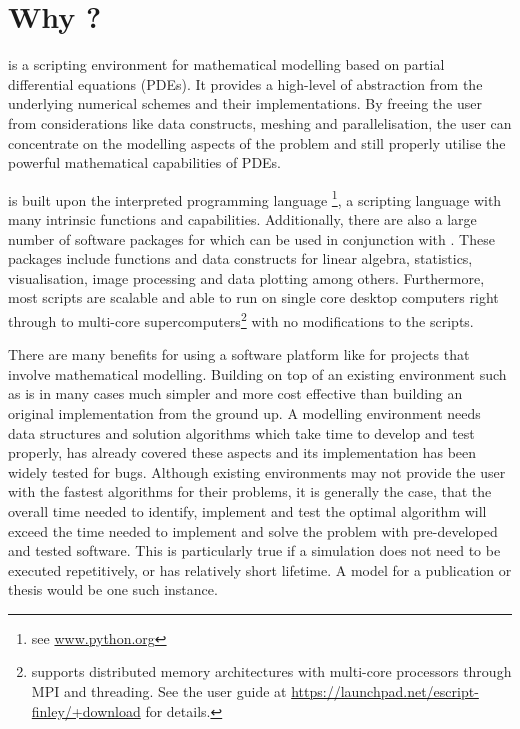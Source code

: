 
%
%
%

\section{Why \esc?}
\esc is a scripting environment for mathematical modelling based on partial
differential equations (PDEs). It provides a high-level of abstraction from the
underlying numerical schemes and their implementations. By freeing the user from
considerations like data constructs, meshing and parallelisation, the user can
concentrate on the modelling aspects of the problem and still properly utilise
the powerful mathematical capabilities of PDEs. 

\esc is built upon the interpreted programming language \pyt\footnote{see
\url{www.python.org}}, a scripting language with many intrinsic functions and
capabilities. Additionally, there are also a large number of software packages
for \pyt which can be used in conjunction with \esc. These packages include
functions and data constructs for linear algebra, statistics, visualisation,
image processing and data plotting among others. Furthermore, most \esc scripts
are scalable and able to run on single core desktop computers right through to
multi-core supercomputers\footnote{\esc supports distributed memory
architectures with multi-core processors through MPI and threading. See the \esc
user guide at \url{https://launchpad.net/escript-finley/+download} for details.}
with no modifications to the scripts. 

There are many benefits for using a software platform like \esc for projects
that involve mathematical modelling. Building on top of an existing environment
such as \esc is in many cases much simpler and more cost effective than
building an original implementation from the ground up. A modelling environment
needs data structures and solution algorithms which take time to develop and
test properly, \esc has already covered these aspects and its implementation
has been widely tested for bugs. Although existing environments may not provide
the user with the fastest algorithms for their problems, it is generally the
case, that the overall time needed to identify, implement and test the optimal
algorithm will exceed the time needed to implement and solve the problem with
pre-developed and tested software. This is particularly true if a simulation
does not need to be executed repetitively, or has relatively short lifetime.
A model for a publication or thesis would be one such instance. 

